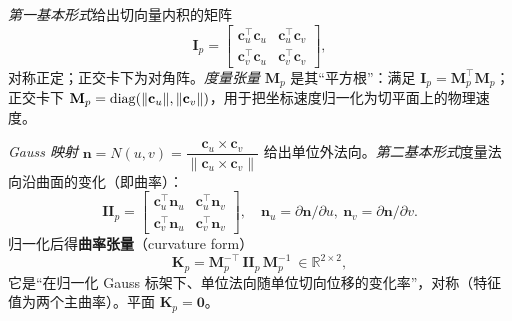 \begin{definition}\label{def:gp-first-form}
\emph{第一基本形式}给出切向量内积的矩阵
\begin{equation}
  \mathbf{I}_p=\begin{bmatrix}\mathbf{c}_u^\top\mathbf{c}_u & \mathbf{c}_u^\top\mathbf{c}_v\\ \mathbf{c}_v^\top\mathbf{c}_u & \mathbf{c}_v^\top\mathbf{c}_v\end{bmatrix},
  \label{eq:gp-first-form}
\end{equation}
对称正定；正交卡下为对角阵。\emph{度量张量} $\mathbf{M}_p$ 是其“平方根”：满足 $\mathbf{I}_p=\mathbf{M}_p^\top\mathbf{M}_p$；正交卡下 $\mathbf{M}_p=\operatorname{diag}(\|\mathbf{c}_u\|,\|\mathbf{c}_v\|)$，用于把坐标速度归一化为切平面上的物理速度。
\end{definition}

\begin{definition}\label{def:gp-second-form}
\emph{Gauss 映射} $\mathbf{n}=N(u,v)=\dfrac{\mathbf{c}_u\times\mathbf{c}_v}{\|\mathbf{c}_u\times\mathbf{c}_v\|}$ 给出单位外法向。\emph{第二基本形式}度量法向沿曲面的变化（即曲率）：
\begin{equation}
  \mathbf{II}_p=\begin{bmatrix}\mathbf{c}_u^\top\mathbf{n}_u & \mathbf{c}_u^\top\mathbf{n}_v\\ \mathbf{c}_v^\top\mathbf{n}_u & \mathbf{c}_v^\top\mathbf{n}_v\end{bmatrix},\quad \mathbf{n}_u=\partial\mathbf{n}/\partial u,\ \mathbf{n}_v=\partial\mathbf{n}/\partial v.
  \label{eq:gp-second-form}
\end{equation}
归一化后得\textbf{曲率张量}（curvature form）
\begin{equation}
  \mathbf{K}_p=\mathbf{M}_p^{-\top}\,\mathbf{II}_p\,\mathbf{M}_p^{-1}\ \in\mathbb{R}^{2\times 2},
  \label{eq:gp-curvature}
\end{equation}
它是“在归一化 Gauss 标架下、单位法向随单位切向位移的变化率”，对称（特征值为两个主曲率）。平面 $\mathbf{K}_p=\mathbf{0}$。
\end{definition}

